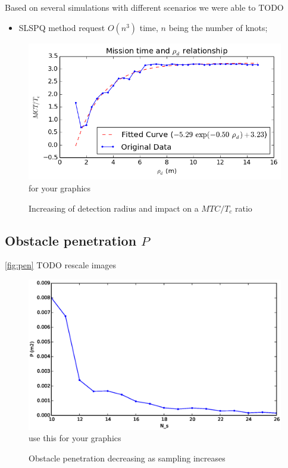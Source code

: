 \documentclass[eprint]{actapoly}
\begin{document}
Based on several simulations with different scenarios we were able to TODO

\begin{itemize}
 \item 
 SLSPQ method request $O(n^3)$ time, $n$ being the number of knots; 
\end{itemize}

\begin{figure}[!h]\centering
  \includegraphics[width=\linewidth]{./images/drho/drho-rmp.png} %
for your graphics
  \caption{Increasing of detection radius and impact on a $MTC/T_c$ 
ratio\label{fig:drho}}
\label{fig:res}
\end{figure}

\subsection{Obstacle penetration $P$}

\ref{fig:pen}
TODO rescale images

\begin{figure}[!h]\centering
  \includegraphics[width=\linewidth]{./images/penetration/pen-nsi.eps} %
use this for your graphics
  \caption{Obstacle penetration decreasing as sampling increases\label{fig:pen}}
\label{fig:res}
\end{figure}
\end{document}
